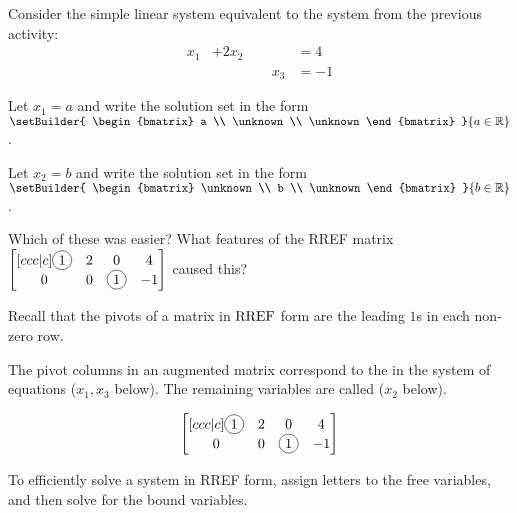\begin{activity}{10}
Consider the simple linear system equivalent to the system
from the previous activity:
	\begin{alignat*}{3}
		x_1 &+ 2x_2 & &= 4\\
	     	 & &\phantom{+}x_3 &= -1
	\end{alignat*}
\begin{subactivity}
Let \(x_1=a\) and write the solution set in the form
\(
  \setBuilder
  {
    \begin{bmatrix} a \\ \unknown \\ \unknown \end{bmatrix}
  }{
    a \in \IR
  }
\).
\end{subactivity}
\begin{subactivity}
Let \(x_2=b\) and write the solution set in the form
\(
  \setBuilder
  {
    \begin{bmatrix} \unknown \\ b \\ \unknown \end{bmatrix}
  }{
    b \in \IR
  }
\).
\end{subactivity}
\begin{subactivity}
Which of these was easier?  What features of the RREF matrix
\(
  \begin{bmatrix}[ccc|c]
    \circledNumber{1} & 2 & 0 & 4 \\
    0 & 0 & \circledNumber{1} & -1
  \end{bmatrix}
\) caused this?
\end{subactivity}
\end{activity}

\begin{definition}
Recall that the pivots of a matrix in \(\operatorname{RREF}\) form are the leading
\(1\)s in each non-zero row.

\vspace{0.2in}

The pivot columns in an augmented matrix correspond to the
 in the system of equations (\(x_1,x_3\) below).
The remaining variables are called  (\(x_2\) below).

\[
  \begin{bmatrix}[ccc|c]
    \circledNumber{1} & 2 & 0 & 4 \\
    0 & 0 & \circledNumber{1} & -1
  \end{bmatrix}
\]

To efficiently solve a system in RREF form, assign letters to the free
variables, and then solve for the bound variables.
\end{definition}

